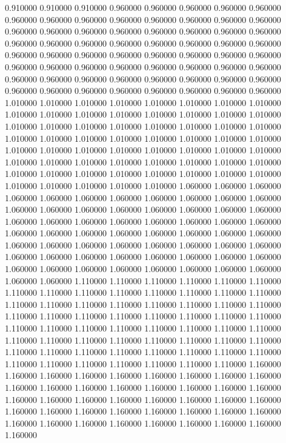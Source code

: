 0.910000
0.910000
0.910000
0.960000
0.960000
0.960000
0.960000
0.960000
0.960000
0.960000
0.960000
0.960000
0.960000
0.960000
0.960000
0.960000
0.960000
0.960000
0.960000
0.960000
0.960000
0.960000
0.960000
0.960000
0.960000
0.960000
0.960000
0.960000
0.960000
0.960000
0.960000
0.960000
0.960000
0.960000
0.960000
0.960000
0.960000
0.960000
0.960000
0.960000
0.960000
0.960000
0.960000
0.960000
0.960000
0.960000
0.960000
0.960000
0.960000
0.960000
0.960000
0.960000
0.960000
0.960000
0.960000
0.960000
0.960000
0.960000
0.960000
0.960000
0.960000
0.960000
0.960000
0.960000
1.010000
1.010000
1.010000
1.010000
1.010000
1.010000
1.010000
1.010000
1.010000
1.010000
1.010000
1.010000
1.010000
1.010000
1.010000
1.010000
1.010000
1.010000
1.010000
1.010000
1.010000
1.010000
1.010000
1.010000
1.010000
1.010000
1.010000
1.010000
1.010000
1.010000
1.010000
1.010000
1.010000
1.010000
1.010000
1.010000
1.010000
1.010000
1.010000
1.010000
1.010000
1.010000
1.010000
1.010000
1.010000
1.010000
1.010000
1.010000
1.010000
1.010000
1.010000
1.010000
1.010000
1.010000
1.010000
1.010000
1.010000
1.010000
1.010000
1.010000
1.010000
1.060000
1.060000
1.060000
1.060000
1.060000
1.060000
1.060000
1.060000
1.060000
1.060000
1.060000
1.060000
1.060000
1.060000
1.060000
1.060000
1.060000
1.060000
1.060000
1.060000
1.060000
1.060000
1.060000
1.060000
1.060000
1.060000
1.060000
1.060000
1.060000
1.060000
1.060000
1.060000
1.060000
1.060000
1.060000
1.060000
1.060000
1.060000
1.060000
1.060000
1.060000
1.060000
1.060000
1.060000
1.060000
1.060000
1.060000
1.060000
1.060000
1.060000
1.060000
1.060000
1.060000
1.060000
1.060000
1.060000
1.060000
1.060000
1.060000
1.060000
1.060000
1.110000
1.110000
1.110000
1.110000
1.110000
1.110000
1.110000
1.110000
1.110000
1.110000
1.110000
1.110000
1.110000
1.110000
1.110000
1.110000
1.110000
1.110000
1.110000
1.110000
1.110000
1.110000
1.110000
1.110000
1.110000
1.110000
1.110000
1.110000
1.110000
1.110000
1.110000
1.110000
1.110000
1.110000
1.110000
1.110000
1.110000
1.110000
1.110000
1.110000
1.110000
1.110000
1.110000
1.110000
1.110000
1.110000
1.110000
1.110000
1.110000
1.110000
1.110000
1.110000
1.110000
1.110000
1.110000
1.110000
1.110000
1.110000
1.110000
1.110000
1.110000
1.160000
1.160000
1.160000
1.160000
1.160000
1.160000
1.160000
1.160000
1.160000
1.160000
1.160000
1.160000
1.160000
1.160000
1.160000
1.160000
1.160000
1.160000
1.160000
1.160000
1.160000
1.160000
1.160000
1.160000
1.160000
1.160000
1.160000
1.160000
1.160000
1.160000
1.160000
1.160000
1.160000
1.160000
1.160000
1.160000
1.160000
1.160000
1.160000
1.160000
1.160000
1.160000
